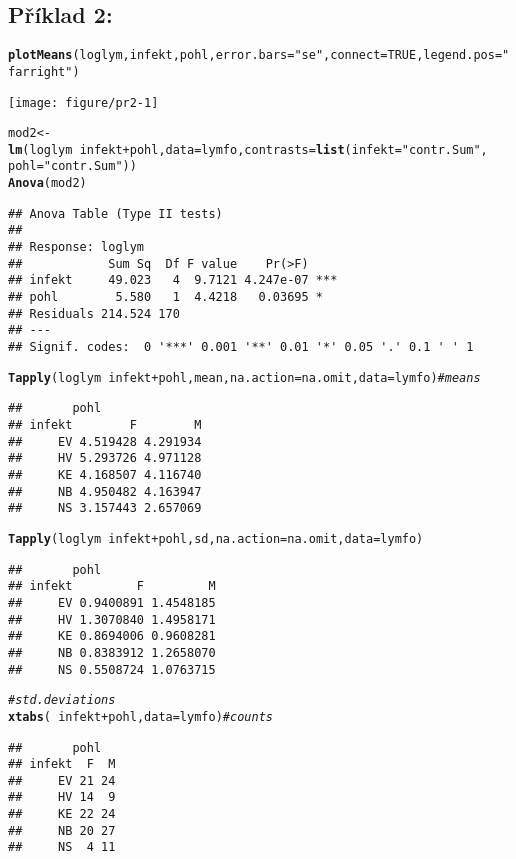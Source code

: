 \documentclass[twoside]{article}\usepackage[]{graphicx}\usepackage[]{color}
\makeatletter
\def\maxwidth{ %
  \ifdim\Gin@nat@width>\linewidth
    \linewidth
  \else
    \Gin@nat@width
  \fi
}
\newcommand{\hlnum}[1]{\textcolor[rgb]{0.686,0.059,0.569}{#1}}%
\newcommand{\hlstr}[1]{\textcolor[rgb]{0.192,0.494,0.8}{#1}}%
\newcommand{\hlcom}[1]{\textcolor[rgb]{0.678,0.584,0.686}{\textit{#1}}}%
\newcommand{\hlopt}[1]{\textcolor[rgb]{0,0,0}{#1}}%
\newcommand{\hlstd}[1]{\textcolor[rgb]{0.345,0.345,0.345}{#1}}%
\newcommand{\hlkwb}[1]{\textcolor[rgb]{0.69,0.353,0.396}{#1}}%
\newcommand{\hlkwc}[1]{\textcolor[rgb]{0.333,0.667,0.333}{#1}}%
\newcommand{\hlkwd}[1]{\textcolor[rgb]{0.737,0.353,0.396}{\textbf{#1}}}%
\newenvironment{kframe}{%
 \def\at@end@of@kframe{}%
 \ifinner\ifhmode%
  \def\at@end@of@kframe{\end{minipage}}%
  \begin{minipage}{\columnwidth}%
 \fi\fi%
 \def\FrameCommand##1{\hskip\@totalleftmargin \hskip-\fboxsep
 \colorbox{shadecolor}{##1}\hskip-\fboxsep
     \hskip-\linewidth \hskip-\@totalleftmargin \hskip\columnwidth}%
 \MakeFramed {\advance\hsize-\width
   \@totalleftmargin\z@ \linewidth\hsize
   \@setminipage}}%
 {\par\unskip\endMakeFramed%
 \at@end@of@kframe}
\newenvironment{knitrout}{}{} %
\makeatother
\begin{document}
\subsection*{Příklad 2:}
\begin{knitrout}
\color{fgcolor}\begin{kframe}
\begin{alltt}
\hlkwd{plotMeans}\hlstd{(loglym, infekt, pohl,} \hlkwc{error.bars}\hlstd{=}\hlstr{"se"}\hlstd{,} \hlkwc{connect}\hlstd{=}\hlnum{TRUE}\hlstd{,} \hlkwc{legend.pos}\hlstd{=}\hlstr{"farright"}\hlstd{)}
\end{alltt}
\end{kframe}
\texttt{[image: figure/pr2-1]} 
\begin{kframe}\begin{alltt}
\hlstd{mod2} \hlkwb{<-} \hlkwd{lm}\hlstd{(loglym} \hlopt{~} \hlstd{infekt} \hlopt{+} \hlstd{pohl,} \hlkwc{data}\hlstd{=lymfo,} \hlkwc{contrasts}\hlstd{=}\hlkwd{list}\hlstd{(}\hlkwc{infekt}\hlstd{=}\hlstr{"contr.Sum"}\hlstd{,}
  \hlkwc{pohl}\hlstd{=}\hlstr{"contr.Sum"}\hlstd{))}
\hlkwd{Anova}\hlstd{(mod2)}
\end{alltt}
\begin{verbatim}
## Anova Table (Type II tests)
## 
## Response: loglym
##            Sum Sq  Df F value    Pr(>F)    
## infekt     49.023   4  9.7121 4.247e-07 ***
## pohl        5.580   1  4.4218   0.03695 *  
## Residuals 214.524 170                      
## ---
## Signif. codes:  0 '***' 0.001 '**' 0.01 '*' 0.05 '.' 0.1 ' ' 1
\end{verbatim}
\begin{alltt}
\hlkwd{Tapply}\hlstd{(loglym} \hlopt{~} \hlstd{infekt} \hlopt{+} \hlstd{pohl, mean,} \hlkwc{na.action}\hlstd{=na.omit,} \hlkwc{data}\hlstd{=lymfo)} \hlcom{# means}
\end{alltt}
\begin{verbatim}
##       pohl
## infekt        F        M
##     EV 4.519428 4.291934
##     HV 5.293726 4.971128
##     KE 4.168507 4.116740
##     NB 4.950482 4.163947
##     NS 3.157443 2.657069
\end{verbatim}
\begin{alltt}
\hlkwd{Tapply}\hlstd{(loglym} \hlopt{~} \hlstd{infekt} \hlopt{+} \hlstd{pohl, sd,} \hlkwc{na.action}\hlstd{=na.omit,} \hlkwc{data}\hlstd{=lymfo)}
\end{alltt}
\begin{verbatim}
##       pohl
## infekt         F         M
##     EV 0.9400891 1.4548185
##     HV 1.3070840 1.4958171
##     KE 0.8694006 0.9608281
##     NB 0.8383912 1.2658070
##     NS 0.5508724 1.0763715
\end{verbatim}
\begin{alltt}
  \hlcom{# std. deviations}
\hlkwd{xtabs}\hlstd{(}\hlopt{~} \hlstd{infekt} \hlopt{+} \hlstd{pohl,} \hlkwc{data}\hlstd{=lymfo)} \hlcom{# counts}
\end{alltt}
\begin{verbatim}
##       pohl
## infekt  F  M
##     EV 21 24
##     HV 14  9
##     KE 22 24
##     NB 20 27
##     NS  4 11
\end{verbatim}
\end{kframe}
\end{knitrout}
\end{document}
